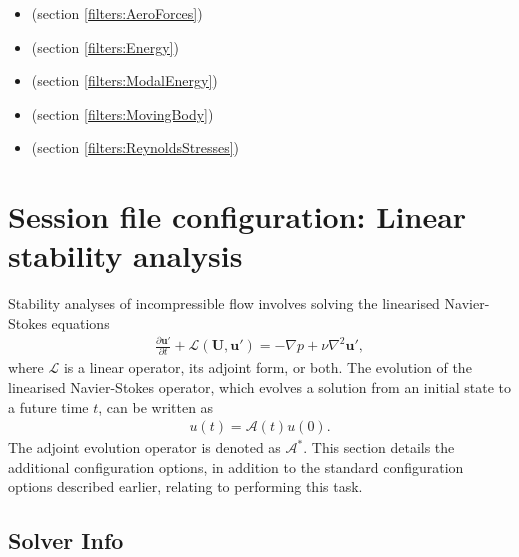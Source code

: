 \begin{itemize}
  \item {} (section \ref{filters:AeroForces})
  \item {} (section \ref{filters:Energy})
  \item {} (section \ref{filters:ModalEnergy})
  \item {} (section \ref{filters:MovingBody})
  \item {} (section \ref{filters:ReynoldsStresses})
\end{itemize}

\section{Session file configuration: Linear stability analysis}
\label{SecStabFile}
Stability analyses of incompressible flow involves solving the linearised Navier-Stokes equations
\begin{align*}
    \frac{\partial\mathbf{u'}}{\partial t} +\mathcal{L}(\mathbf{U},\mathbf{u'})=-\nabla p+\nu \nabla^2 \mathbf{u'},
\end{align*}
where $\mathcal{L}$ is a linear operator, its adjoint form, or both. The evolution of the linearised Navier-Stokes operator, which evolves a solution from an initial state to a future time $t$, can be written as
\begin{align*}
u(t) = \mathcal{A}(t)u(0).
\end{align*}
The adjoint evolution operator is denoted as $\mathcal{A}^*$.
This section details the additional configuration options, in addition to the standard configuration options described earlier, relating to performing this task.

\subsection{Solver Info}
\label{SectionIncNS_SolverInfo_Stab}

